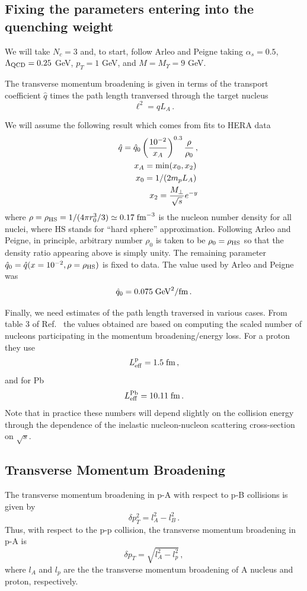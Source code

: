 \documentclass[11pt,onecolumn]{article}
\newcommand{\beq}{\begin{equation}}
\newcommand{\eeq}{\end{equation}}
\newcommand{\bqa}{\begin{eqnarray}}
\newcommand{\eqa}{\end{eqnarray}}
\begin{document}
\subsection{Fixing the parameters entering into the quenching weight}
We will take $N_c = 3$ and, to start, follow Arleo and Peigne \cite{Arleo:2012rs} taking $\alpha_s = 0.5$, $\Lambda_{\rm QCD} = 0.25$ GeV, $p_T = 1$ GeV, and $M = M_\Upsilon = 9$ GeV.

The transverse momentum broadening is given in terms of the transport coefficient $\hat{q}$ times the path length tranversed through the target nucleus
%
\beq
\ell^2 = \hat{q} L_A \, .
\label{eq:L_A}
\eeq


We will assume the following result which comes from fits to HERA data \cite{Golec-Biernat:1998zce}
%
\bqa
&& \hat{q} = \hat{q}_0 \left( \frac{10^{-2}}{x_A} \right)^{0.3} \frac{\rho}{\rho_0} \, , \nonumber \\
&& x_A = {\rm min}(x_0,x_2) \, \nonumber \\
&& x_{0} = 1/(2 m_p L_A) \, \nonumber \\
&& x_2 = \frac{M_\perp}{\sqrt{s}} e^{-y} 
\label{eq:eqs}
\eqa
%
where $\rho = \rho_{\rm HS} = 1/(4 \pi r_0^3/3) \simeq 0.17 \; {\rm fm}^{-3}$ is the nucleon number density for all nuclei, where HS stands for ``hard sphere'' approximation.  Following Arleo and Peigne, in principle, arbitrary number $\rho_0$ is taken to be $\rho_0 = \rho_{\rm HS}$ so that the density ratio appearing above is simply unity.  The remaining parameter $\hat{q}_0 = \hat{q}(x=10^{-2},\rho=\rho_{\rm HS})$ is fixed to data.  The value used by Arleo and Peigne \cite{Arleo:2012rs} was
%
\beq
\hat{q}_0 = 0.075 \; {\rm GeV}^2/{\rm fm} \, .
\eeq

Finally, we need estimates of the path length traversed in various cases.  From table 3 of Ref.~\cite{Arleo:2012rs} the values obtained are based on computing the scaled number of nucleons participating in the momentum broadening/energy loss.  For a proton they use
%
\beq
L_{\rm eff}^{\rm p} = 1.5 \; {\rm fm} \, ,
\eeq
%
and for Pb 
%
\beq
L_{\rm eff}^{\rm Pb} = 10.11 \; {\rm fm} \, .
\eeq
%
Note that in practice these numbers will depend slightly on the collision energy through the dependence of the inelastic nucleon-nucleon scattering cross-section on $\sqrt{s}$.
\subsection{Transverse Momentum Broadening}
The transverse momentum broadening in p-A with respect to p-B collisions is given by
%
\beq
\delta p_T^2 = l^2_A - l^2_B \, .
\label{eq:dpt}
\eeq
%
Thus, with respect to the p-p collision, the transverse momentum broadening in p-A is
%
\beq
\delta p_T = \sqrt{l^2_A - l^2_p} \, ,
\eeq
%
where $l_A$ and $l_p$ are the the transverse momentum broadening of A nucleus and proton, respectively.
\end{document}
